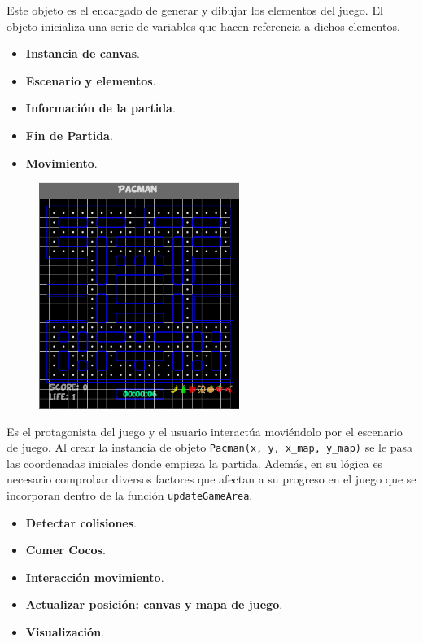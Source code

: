 \documentclass[notes,slidesec,a4]{seminar}
\begin{document}
\begin{hslide}
Este objeto es el encargado de generar y dibujar los elementos del juego. El objeto inicializa una serie de variables que hacen referencia a dichos elementos. 
\begin{itemize}
\item \textbf{Instancia de canvas}.
\item \textbf{Escenario y elementos}.
\item \textbf{Información de la partida}.
\item \textbf{Fin de Partida}.
\item \textbf{Movimiento}.
\end{itemize}
\begin{minipage}{8cm}
\begin{center}
\begin{figure}
\includegraphics[width=6.5cm]{img/InfoGame.png}
\end{figure}
\end{center}
\end{minipage}
\end{hslide}

\begin{hslide}
Es el protagonista del juego y el usuario interactúa moviéndolo por el escenario de juego. Al crear la instancia de objeto \texttt{Pacman(x, y, x\_map, y\_map)} se le pasa las coordenadas iniciales donde empieza la partida. Además, en su lógica es necesario comprobar diversos factores que afectan a su progreso en el juego que se incorporan dentro de la función \texttt{updateGameArea}. 
\begin{itemize}
\item \textbf{Detectar colisiones}.
\item \textbf{Comer Cocos}.
\item \textbf{Interacción movimiento}.
\item \textbf{Actualizar posición: canvas y mapa de juego}.
\item \textbf{Visualización}.
\end{itemize}
\end{hslide}
\end{document}
